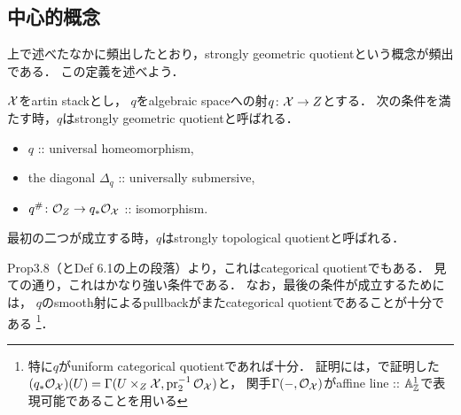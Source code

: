 \documentclass[a4paper, dvipdfmx]{jsarticle}
\begin{document}
    \subsection{中心的概念}
    上で述べたなかに頻出したとおり，strongly geometric quotientという概念が頻出である．
    この定義を述べよう．
    \begin{Def}
        $\mathcal{X}$をartin stackとし，
        $q$をalgebraic spaceへの射$q \colon \mathcal{X} \to Z$とする．
        次の条件を満たす時，$q$はstrongly geometric quotientと呼ばれる．
        \begin{itemize}
            \item $q$ :: universal homeomorphism,
            \item the diagonal $\Delta_q$ :: universally submersive,
            \item $q^{\#} \colon \mathcal{O}_{Z} \to q_*\mathcal{O}_{\mathcal{X}}$ :: isomorphism.
        \end{itemize}
        最初の二つが成立する時，$q$はstrongly topological quotientと呼ばれる．
    \end{Def}
    \cite{Rydh13} Prop3.8（とDef 6.1の上の段落）より，これはcategorical quotientでもある．
    見ての通り，これはかなり強い条件である．
    なお，最後の条件が成立するためには，
    $q$のsmooth射によるpullbackがまたcategorical quotientであることが十分である
    \footnote
    {
        特に$q$がuniform categorical quotientであれば十分．
        証明には，\cite{SAAlgSt}で証明した
        $(q_*\mathcal{O}_{\mathcal{X}})(U)=\Gamma(U \times_{Z} \mathcal{X}, \operatorname{pr}_2^{-1}\mathcal{O}_{\mathcal{X}})$と，
        関手$\Gamma(-, \mathcal{O}_{\mathcal{X}})$がaffine line :: $\mathbb{A}_{\mathbb{Z}}^1$で表現可能であることを用いる
    }．



\end{document}
